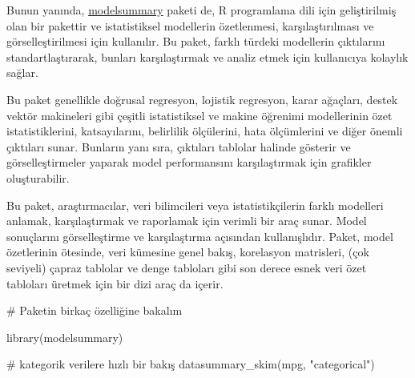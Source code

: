 \documentclass[
  letterpaper,
  DIV=11,
  numbers=noendperiod]{scrreprt}
\newenvironment{Shaded}{\begin{snugshade}}{\end{snugshade}}
\newcommand{\CommentTok}[1]{\textcolor[rgb]{0.37,0.37,0.37}{#1}}
\newcommand{\FunctionTok}[1]{\textcolor[rgb]{0.28,0.35,0.67}{#1}}
\newcommand{\NormalTok}[1]{\textcolor[rgb]{0.00,0.23,0.31}{#1}}
\newcommand{\StringTok}[1]{\textcolor[rgb]{0.13,0.47,0.30}{#1}}
\begin{document}
Bunun yanında, \href{https://modelsummary.com/}{modelsummary} paketi de,
R programlama dili için geliştirilmiş olan bir pakettir ve istatistiksel
modellerin özetlenmesi, karşılaştırılması ve görselleştirilmesi için
kullanılır. Bu paket, farklı türdeki modellerin çıktılarını
standartlaştırarak, bunları karşılaştırmak ve analiz etmek için
kullanıcıya kolaylık sağlar.

Bu paket genellikle doğrusal regresyon, lojistik regresyon, karar
ağaçları, destek vektör makineleri gibi çeşitli istatistiksel ve makine
öğrenimi modellerinin özet istatistiklerini, katsayılarını, belirlilik
ölçülerini, hata ölçümlerini ve diğer önemli çıktıları sunar. Bunların
yanı sıra, çıktıları tablolar halinde gösterir ve görselleştirmeler
yaparak model performansını karşılaştırmak için grafikler oluşturabilir.

Bu paket, araştırmacılar, veri bilimcileri veya istatistikçilerin farklı
modelleri anlamak, karşılaştırmak ve raporlamak için verimli bir araç
sunar. Model sonuçlarını görselleştirme ve karşılaştırma açısından
kullanışlıdır. Paket, model özetlerinin ötesinde, veri kümesine genel
bakış, korelasyon matrisleri, (çok seviyeli) çapraz tablolar ve denge
tabloları gibi son derece esnek veri özet tabloları üretmek için bir
dizi araç da içerir.

\begin{Shaded}
\begin{Highlighting}[]
\CommentTok{\# Paketin birkaç özelliğine bakalım}

\FunctionTok{library}\NormalTok{(modelsummary)}

\CommentTok{\# kategorik verilere hızlı bir bakış}
\FunctionTok{datasummary\_skim}\NormalTok{(mpg, }\StringTok{"categorical"}\NormalTok{)}
\end{Highlighting}
\end{Shaded}
\end{document}

